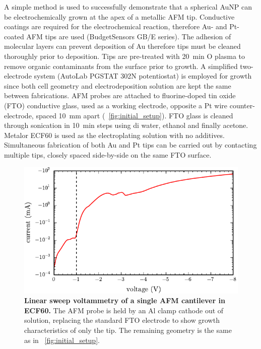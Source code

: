 \documentclass{article}
\begin{document}
A simple method is used to successfully demonstrate that a spherical AuNP can be electrochemically grown at the apex of a metallic AFM tip. Conductive coatings are required for the electrochemical reaction, therefore Au- and Pt-coated AFM tips are used (BudgetSensors GB/E series). The adhesion of molecular layers can prevent deposition of Au therefore tips must be cleaned thoroughly prior to deposition. Tips are pre-treated with \SI{20}{\minute} O plasma to remove organic contaminants from the surface prior to growth. A simplified two-electrode system (AutoLab PGSTAT 302N potentiostat) is employed for growth since both cell geometry and electrodeposition solution are kept the same between fabrications. AFM probes are attached to fluorine-doped tin oxide (FTO) conductive glass, used as a working electrode, opposite a Pt wire counter-electrode, spaced \SI{10}{mm} apart (\figurename~\ref{fig:initial_setup}). FTO glass is cleaned through sonication in \SI{10}{\minute} steps using \gls{di} water, ethanol and finally acetone. Metalor ECF60 is used as the electroplating solution with no additives. Simultaneous fabrication of both Au and Pt tips can be carried out by contacting multiple tips, closely spaced side-by-side on the same FTO surface.

\begin{figure}[bt]
\centering
\includegraphics{figures/initial_cv}
\caption[Linear sweep voltammetry of a single AFM cantilever in ECF60]{\textbf{Linear sweep voltammetry of a single AFM cantilever in ECF60.} The AFM probe is held by an Al clamp cathode out of solution, replacing the standard FTO electrode to show growth characteristics of only the tip. The remaining geometry is the same as in \figurename~\ref{fig:initial_setup}.}
\label{fig:initial_cv}
\end{figure}
\end{document}
